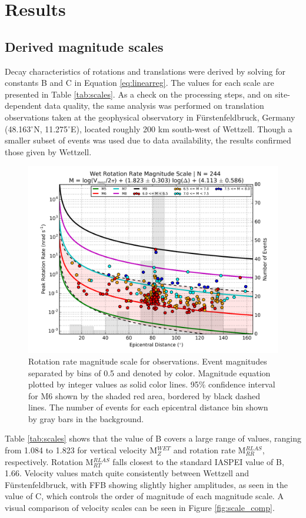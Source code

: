 \documentclass{gji}
\begin{document}
\section{Results}\label{sec:results}
\subsection{Derived magnitude scales}
Decay characteristics of rotations and translations were derived by solving for constants B and C in Equation \ref{eq:linearreg}. The values for each scale are presented in Table \ref{tab:scales}. As a check on the processing steps, and on site-dependent data quality, the same analysis was performed on translation observations taken at the geophysical observatory in F\"urstenfeldbruck, Germany (48.163$^\circ$N, 11.275$^\circ$E), located roughly 200 km south-west of Wettzell. Though a smaller subset of events was used due to data availability, the results confirmed those given by Wettzell. 


\begin{figure}
\centerline{\includegraphics[width=.8\textwidth]{rr_obs}}
\caption{Rotation rate magnitude scale for observations. Event magnitudes separated by bins of 0.5 and denoted by color. Magnitude equation plotted by integer values as solid color lines. 95\% confidence interval for M6 shown by the shaded red area, bordered by black dashed lines. The number of events for each epicentral distance bin shown by gray bars in the background.}
\label{fig:rr_obs}
\end{figure}


Table \ref{tab:scales} shows that the value of B covers a large range of values, ranging from 1.084 to 1.823 for vertical velocity M$^{WET}_{Z}$ and rotation rate M$^{RLAS}_{RR}$, respectively. Rotation M$^{RLAS}_{RT}$ falls closest to the standard IASPEI value of B, 1.66. Velocity values match quite consistently between Wettzell and F\"urstenfeldbruck, with FFB showing slightly higher amplitudes, as seen in the value of C, which controls the order of magnitude of each magnitude scale. A visual comparison of velocity scales can be seen in Figure \ref{fig:scale_comp}. 
\end{document}
